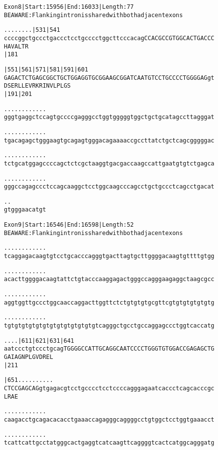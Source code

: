 \documentclass{article}
\begin{document}
\newpage
\begin{alltt}
Exon 8 | Start: 15956 | End: 16033 | Length: 77
BE AWARE: Flanking intron is shared with both adjacent exons

.    .    .    .    .    .    .    .          |531      |541
ccccggctgccctgaccctcctgcccctggcttcccacagCCACGCCGTGGCACTGACCC
                                         H  A  V  A  L  T  R
                                                        |181

      |551      |561      |571      |581      |591      |601
GAGACTCTGAGCGGCTGCTGGAGGTGCGGAAGCGGATCAATGTCCTGCCCCTGGGGAGgt
  D  S  E  R  L  L  E  V  R  K  R  I  N  V  L  P  L  G  S   
                          |191                          |201

  .    .    .    .    .    .    .    .    .    .    .    .  
gggtgaggctccagtgccccgagggcctggtgggggtggctgctgcatagccttagggat

  .    .    .    .    .    .    .    .    .    .    .    .  
tgacagagctgggaagtgcagagtgggacagaaaaccgccttatctgctcagcgggggac

  .    .    .    .    .    .    .    .    .    .    .    .  
tctgcatggagccccagctctcgctaaggtgacgaccaagccattgaatgtgtctgagca

  .    .    .    .    .    .    .    .    .    .    .    .  
gggccagagccctccagcaaggctcctggcaagcccagcctgctgccctcagcctgacat

  .    .    
gtgggaacatgt
\end{alltt}
\newpage
\begin{alltt}
Exon 9 | Start: 16546 | End: 16598 | Length: 52
BE AWARE: Flanking intron is shared with both adjacent exons

.    .    .    .    .    .    .    .    .    .    .    .    
tcaggagacaagtgtcctgcacccagggtgacttagtgcttggggacaagtgttttgtgg

.    .    .    .    .    .    .    .    .    .    .    .    
acacttggggacaagtattctgtacccaaggagactgggccagggaagaggctaagcgcc

.    .    .    .    .    .    .    .    .    .    .    .    
aggtggttgccctggcaaccaggacttggttctctgtgtgtgcgttcgtgtgtgtgtgtg

.    .    .    .    .    .    .    .    .    .    .    .    
tgtgtgtgtgtgtgtgtgtgtgtgtgtcagggctgcctgccaggagccctggtcaccatg

.    .    .    .         |611      |621      |631      |641 
aatccctgtccctgcagTGGGGCCATTGCAGGCAATCCCCTGGGTGTGGACCGAGAGCTG
                  G  A  I  A  G  N  P  L  G  V  D  R  E  L  
                                             |211           

     |651     .    .    .    .    .    .    .    .    .    .
CTCCGAGCAGgtgagacgtcctgcccctcctccccagggagaatcaccctcagcacccgc
L  R  A  E                                                  

    .    .    .    .    .    .    .    .    .    .    .    .
caagacctgcagacacacctgaaaccagagggcaggggcctgtggctcctggtgaaacct

    .    .    .    .    .    .    .    .    .    .    .    .
tcattcattgcctatgggcactgaggtcatcaagttcaggggtcactcatggcagggatg
\end{alltt}
\end{document}
